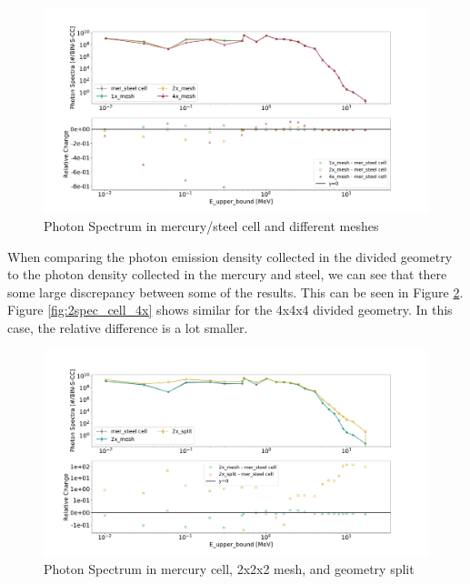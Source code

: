 \begin{figure}[H]
 \centering
 \includegraphics[scale=0.42,trim={2cm 0.5cm 3cm 2cm},clip]{../figs/toy_p2/spec_VPII_1x_2x_4x.pdf}
 \caption{Photon Spectrum in mercury/steel cell and different meshes}
 \label{fig:2spec_cell_1x_2x_4x}
\end{figure}
%
When comparing the photon emission density collected in the divided geometry
to the photon density collected in the mercury and steel, we can see that
there some large discrepancy between some of the results. This can be seen in
Figure \ref{fig:2spec_cell_2x}. Figure \ref{fig:2spec_cell_4x} shows similar
for the 4x4x4 divided geometry. In this case, the relative difference is a lot
smaller.
%
\begin{figure}[H]
 \centering
 \includegraphics[scale=0.42,trim={2cm 0.5cm 3cm 2cm},clip]{../figs/toy_p2/spec_VPII_2x.pdf}
 \caption{Photon Spectrum in mercury cell, 2x2x2 mesh, and geometry split}
 \label{fig:2spec_cell_2x}
\end{figure}
%
